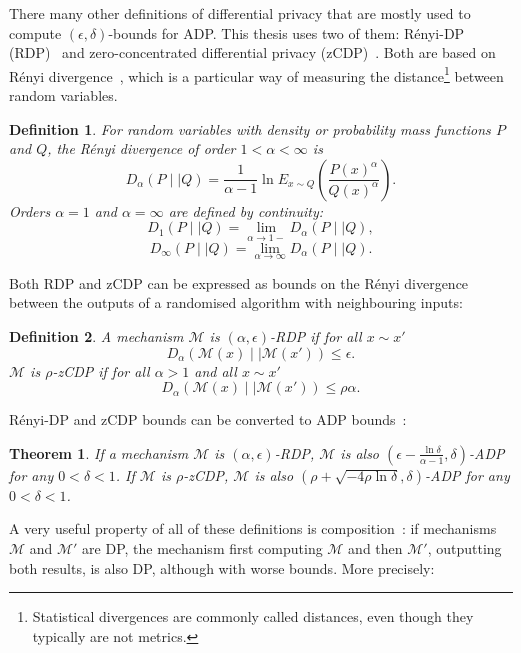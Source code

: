 \documentclass[english,twoside,openright]{HYgraduMLDS}
\newtheorem{theorem}{Theorem}
\newtheorem{definition}{Definition}
\newcommand{\dmid}{\mid\mid}
\newcommand{\calm}{{\mathcal{M}}}
\begin{document}
There many other definitions of differential privacy that are mostly used
to compute \((\epsilon, \delta)\)-bounds for ADP. This thesis uses two of them: 
Rényi-DP (RDP)~\cite{Mironov17} and 
zero-concentrated differential privacy (zCDP)~\cite{BuS16}. Both are based 
on Rényi divergence~\cite{Mironov17}, which is a particular way of 
measuring the distance\footnote{
  Statistical divergences are commonly called distances, even though they
  typically are not metrics.
} between random variables.

\begin{definition}
    For random variables with density or probability mass functions 
    \(P\) and \(Q\), the Rényi divergence of order
    \(1 < \alpha < \infty\) is
    \[
        D_\alpha(P\dmid Q) = \frac{1}{\alpha - 1}\ln E_{x\sim Q}
        \left(\frac{P(x)^\alpha}{Q(x)^\alpha}\right).
    \]
    Orders \(\alpha = 1\) and \(\alpha = \infty\) are defined 
    by continuity:
    \[
        D_1(P\dmid Q) = \lim_{\alpha \to 1-} D_\alpha(P\dmid Q),
    \]
    \[
        D_\infty(P \dmid Q) = \lim_{\alpha\to \infty}D_\alpha(P\dmid Q).
    \]
\end{definition}

Both RDP and zCDP can be expressed as bounds on the
Rényi divergence between the outputs of a randomised algorithm with
neighbouring inputs:

\begin{definition}
    A mechanism \(\calm\) is \((\alpha, \epsilon)\)-RDP
    if for all \(x \sim x'\)
    \[
        D_\alpha(\calm(x)\dmid \calm(x')) \leq \epsilon.
    \]
    \(\calm\) is \(\rho\)-zCDP if for all \(\alpha > 1\)
    and all \(x \sim x'\)
    \[
        D_\alpha(\calm(x)\dmid \calm(x')) \leq \rho \alpha.
    \]

\end{definition}

Rényi-DP and zCDP bounds can be converted to ADP bounds~\cite{Mironov17, BuS16}:
\begin{theorem}\label{other_dp_to_adp}
    If a mechanism \(\calm\) is \((\alpha, \epsilon)\)-RDP, \(\calm\) is also
    \((\epsilon - \frac{\ln \delta}{\alpha - 1}, \delta)\)-ADP for any 
    \(0 < \delta < 1\). If \(\calm\) is \(\rho\)-zCDP, \(\calm\) is also 
    \((\rho + \sqrt{-4\rho\ln \delta}, \delta)\)-ADP for any \(0 < \delta < 1\).
\end{theorem}

A very useful property of all of these definitions is composition~\cite{DwR14}: 
if mechanisms \(\calm\) and \(\calm'\) are DP, the mechanism first computing
\(\calm\) and then \(\calm'\), outputting both results, 
is also DP, although with worse bounds.
More precisely:
\end{document}
